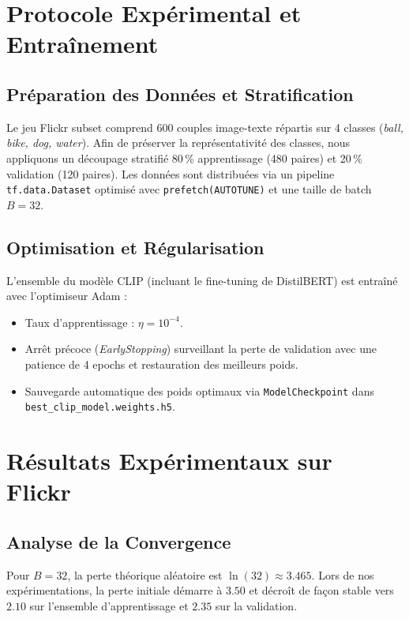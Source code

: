 \documentclass[12pt,a4paper]{article}
\begin{document}
\section{Protocole Expérimental et Entraînement}

\subsection{Préparation des Données et Stratification}
Le jeu Flickr subset comprend 600 couples image-texte répartis sur 4 classes (\textit{ball, bike, dog, water}). Afin de préserver la représentativité des classes, nous appliquons un découpage stratifié 80\,\% apprentissage (480 paires) et 20\,\% validation (120 paires). Les données sont distribuées via un pipeline \texttt{tf.data.Dataset} optimisé avec \texttt{prefetch(AUTOTUNE)} et une taille de batch $B = 32$.

\subsection{Optimisation et Régularisation}
L'ensemble du modèle CLIP (incluant le fine-tuning de DistilBERT) est entraîné avec l'optimiseur Adam :
\begin{itemize}
    \item Taux d'apprentissage : $\eta = 10^{-4}$.
    \item Arrêt précoce (\textit{EarlyStopping}) surveillant la perte de validation avec une patience de 4 epochs et restauration des meilleurs poids.
    \item Sauvegarde automatique des poids optimaux via \texttt{ModelCheckpoint} dans \texttt{best\_clip\_model.weights.h5}.
\end{itemize}

\section{Résultats Expérimentaux sur Flickr}

\subsection{Analyse de la Convergence}
Pour $B = 32$, la perte théorique aléatoire est $\ln(32) \approx 3.465$. Lors de nos expérimentations, la perte initiale démarre à $3.50$ et décroît de façon stable vers $2.10$ sur l'ensemble d'apprentissage et $2.35$ sur la validation.
\end{document}
